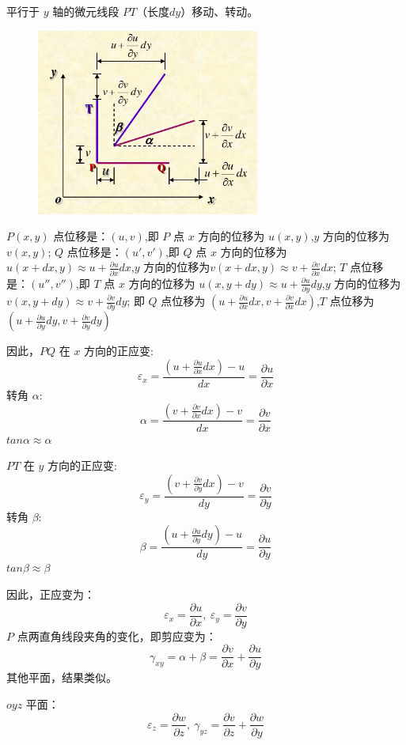 \documentclass[12pt,a4paper]{article}
\begin{document}
平行于 $y$ 轴的微元线段 $PT$（长度$dy$）移动、转动。

\begin{figure}[H]
\centering
\includegraphics[scale=0.5]{./figures/14.png}
\caption{}
\end{figure}

$P(x,y)$ 点位移是：$(u,v)$,即 $P$ 点 $x$ 方向的位移为 $u(x,y)$,$y$ 方向的位移为$v(x,y)$;
$Q$ 点位移是：$(u',v')$,即 $Q$ 点 $x$ 方向的位移为 $u(x+dx,y)\approx u+\frac{\partial u}{\partial x}dx$,$y$ 方向的位移为$v(x+dx,y)\approx v+\frac{\partial v}{\partial x}dx$;
$T$ 点位移是：$(u'',v'')$,即 $T$ 点 $x$ 方向的位移为 $u(x,y+dy)\approx u+\frac{\partial u}{\partial y}dy$,$y$ 方向的位移为 $v(x,y+dy)\approx v+\frac{\partial v}{\partial y}dy$;
即 $Q$ 点位移为 $(u+\frac{\partial u}{\partial x}dx,v+\frac{\partial v}{\partial x}dx)$,$T$ 点位移为 $(u+\frac{\partial u}{\partial y}dy,v+\frac{\partial v}{\partial y}dy)$

因此，$PQ$ 在 $x$ 方向的正应变:
$$
\varepsilon_x=\frac{(u+\frac{\partial u}{\partial x}dx)-u}{dx}=\frac{\partial u}{\partial x}
$$
转角 $\alpha$:
$$
\alpha=\frac{(v+\frac{\partial v}{\partial x}dx)-v}{dx}=\frac{\partial v}{\partial x}
$$
$tan\alpha\approx\alpha$

$PT$ 在 $y$ 方向的正应变:
$$
\varepsilon_y=\frac{(v+\frac{\partial v}{\partial y}dx)-v}{dy}=\frac{\partial v}{\partial y}
$$
转角 $\beta$:
$$
\beta=\frac{(u+\frac{\partial u}{\partial y}dy)-u}{dy}=\frac{\partial u}{\partial y}
$$
$tan\beta\approx\beta$

因此，正应变为：
$$
\varepsilon_x=\frac{\partial u}{\partial x}, ~ \varepsilon_y=\frac{\partial v}{\partial y}
$$
$P$ 点两直角线段夹角的变化，即剪应变为：
$$
\gamma_{xy}=\alpha +\beta =\frac{\partial v}{\partial x}+\frac{\partial u}{\partial y}
$$
其他平面，结果类似。

$oyz$ 平面：
$$
\varepsilon_z=\frac{\partial w}{\partial z}, ~ \gamma_{yz}=\frac{\partial v}{\partial z}+\frac{\partial w}{\partial y}
$$
\end{document}
